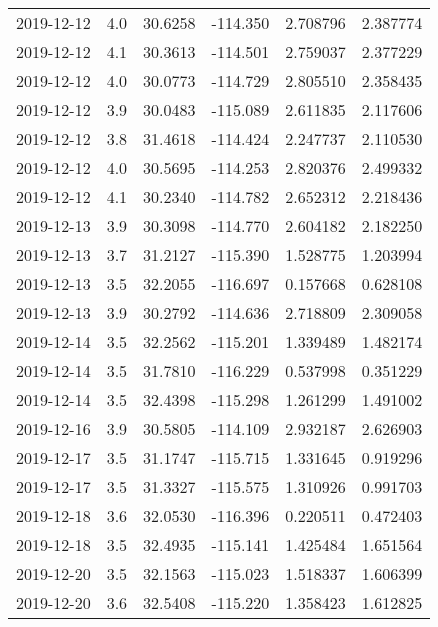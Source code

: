 \begin{tabular}{lrrrrr}
2019-12-12 &       4.0 &  30.6258 &  -114.350 &         2.708796 &         2.387774 \\
2019-12-12 &       4.1 &  30.3613 &  -114.501 &         2.759037 &         2.377229 \\
2019-12-12 &       4.0 &  30.0773 &  -114.729 &         2.805510 &         2.358435 \\
2019-12-12 &       3.9 &  30.0483 &  -115.089 &         2.611835 &         2.117606 \\
2019-12-12 &       3.8 &  31.4618 &  -114.424 &         2.247737 &         2.110530 \\
2019-12-12 &       4.0 &  30.5695 &  -114.253 &         2.820376 &         2.499332 \\
2019-12-12 &       4.1 &  30.2340 &  -114.782 &         2.652312 &         2.218436 \\
2019-12-13 &       3.9 &  30.3098 &  -114.770 &         2.604182 &         2.182250 \\
2019-12-13 &       3.7 &  31.2127 &  -115.390 &         1.528775 &         1.203994 \\
2019-12-13 &       3.5 &  32.2055 &  -116.697 &         0.157668 &         0.628108 \\
2019-12-13 &       3.9 &  30.2792 &  -114.636 &         2.718809 &         2.309058 \\
2019-12-14 &       3.5 &  32.2562 &  -115.201 &         1.339489 &         1.482174 \\
2019-12-14 &       3.5 &  31.7810 &  -116.229 &         0.537998 &         0.351229 \\
2019-12-14 &       3.5 &  32.4398 &  -115.298 &         1.261299 &         1.491002 \\
2019-12-16 &       3.9 &  30.5805 &  -114.109 &         2.932187 &         2.626903 \\
2019-12-17 &       3.5 &  31.1747 &  -115.715 &         1.331645 &         0.919296 \\
2019-12-17 &       3.5 &  31.3327 &  -115.575 &         1.310926 &         0.991703 \\
2019-12-18 &       3.6 &  32.0530 &  -116.396 &         0.220511 &         0.472403 \\
2019-12-18 &       3.5 &  32.4935 &  -115.141 &         1.425484 &         1.651564 \\
2019-12-20 &       3.5 &  32.1563 &  -115.023 &         1.518337 &         1.606399 \\
2019-12-20 &       3.6 &  32.5408 &  -115.220 &         1.358423 &         1.612825 \\

\end{tabular}

